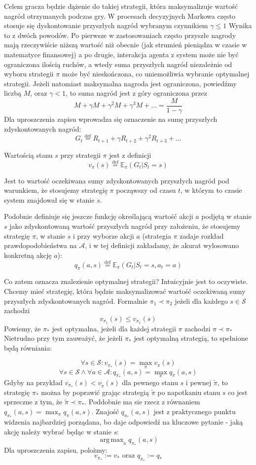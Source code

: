 \documentclass[licencjacka]{pracamgr}
\DeclareMathOperator*{\argmax}{arg\,max}
\begin{document}
Celem gracza będzie dążenie do takiej strategii, która maksymalizuje wartość nagród otrzymanych podczas gry.  W procesach decyzyjnych Markowa często stosuje się dyskontowanie przyszłych nagród wybranym czynnikiem $\gamma\leq1$ Wynika to z dwóch powodów. Po pierwsze w zastosowaniach często przyszłe nagrody mają rzeczywiście niższą wartość niż obecnie (jak strumień pieniądza w czasie w matematyce finansowej) a po drugie, interakcja agenta z system może nie być ograniczona ilością ruchów, a wtedy suma przyszłych nagród niezależnie od wyboru strategii $\pi$ może być nieskończona, co uniemożliwia wybranie optymalnej strategii. Jeżeli natomiast maksymalna nagroda jest ograniczona, powiedźmy liczbą $M$, oraz $\gamma<1$, to suma nagród jest z góry ograniczona przez
$$M+\gamma M +\gamma^{2}M+\gamma^{3}M+...  = \frac{M}{1-\gamma}$$
Dla uproszczenia zapisu wprowadza się oznaczenie na sumę przyszłych zdyskontowanych nagród:
$$G_{t} \stackrel{\text{def}}{=} R_{t+1} + \gamma R_{t+2} + \gamma^{2}R_{t+3} +...$$

Wartością stanu $s$ przy strategii $\pi$ jest z definicji 
$$v_{\pi}(s)\stackrel{\text{def}}{=} \mathbb{E}_{\pi}(G_{t}| S_{t} = s) $$

Jest to wartość oczekiwana sumy zdyskontowanych przyszłych nagród pod warunkiem, że stosujemy strategię $\pi$ począwszy od czasu $t$, w którym to czasie system znajdował się w stanie $s$. 

Podobnie definiuje się jeszcze funkcję określającą wartość akcji $a$ podjętą w stanie $s$ jako zdyskontowaną wartość przyszłych nagród przy założeniu, że stosujemy strategię $\pi$, w stanie $s$ i przy wyborze akcji $a$ (strategia $\pi$ zadaje rozkład prawdopodobieństwa na $\mathcal{A}$, i w tej definicji zakładamy, że akurat wylosowano konkretną akcję $a$):
$$q_{\pi}(a,s) \stackrel{\text{def}}{=} \mathbb{E}_{\pi}(G_{t}| S_{t} = s, a_{t} = a) $$

Co zatem oznacza znalezienie optymalnej strategii? Intuicyjnie jest to oczywiste. Chcemy mieć strategię, która będzie maksymalizować wartość oczekiwaną sumy przyszłych zdyskontowanych nagród. Formalnie $\pi_{1}\prec\pi_{2}$ jeżeli dla każdego $s\in\mathcal{S}$ zachodzi $$v_{\pi_{1}}(s)\leq v_{\pi_{1}}(s)$$
Powiemy, że $\pi_{*}$ jest optymalna, jeżeli dla każdej strategii $\pi$ zachodzi   $\pi\prec\pi_{*}$ Nietrudno przy tym zauważyć, że jeżeli $\pi_{*}$ jest optymalną strategią, to spełnione będą równiania:


$$\forall s\in \mathcal{S}: v_{\pi_{*}}(s) =\max_{\pi} v_{\pi}(s)$$ $$\forall s\in\mathcal{S}\wedge \forall a\in\mathcal{A}: q_{\pi_{*}}(a,s) = \max_{\pi} q_{\pi}(a,s)$$
Gdyby na przykład  $v_{\pi_{*}}(s)<v_{\tilde{\pi}}(s)$ dla pewnego stanu $s$ i  pewnej $\tilde{\pi}$, to  strategię $\pi_{*}$ można by poprawić grając strategią $\tilde{\pi}$ po napotkaniu stanu $s$ co jest sprzeczne z tym, że   $\tilde{\pi}\prec\pi_{*}$. Poddobnie ma sie rzecz z równaniem $q_{\pi_{*}}(a,s) = \max_{\pi} q_{\pi}(a,s)$.  Znajość $q_{\pi_{*}}(a,s)$ jest z praktycznego punktu widzenia najbardziej porządana, bo daje odpowiedź na kluczowe pytanie - jaką akcję należy wybrać będąc w stanie $s$:\\
$$\argmax_{a}q_{\pi_{*}}(a,s)$$
Dla uproszczenia zapisu, polożmy:
$$v_{\pi_{*}}:=v_{*}\text{ oraz } q_{\pi_{*}}:=q_{*}$$
\end{document}
